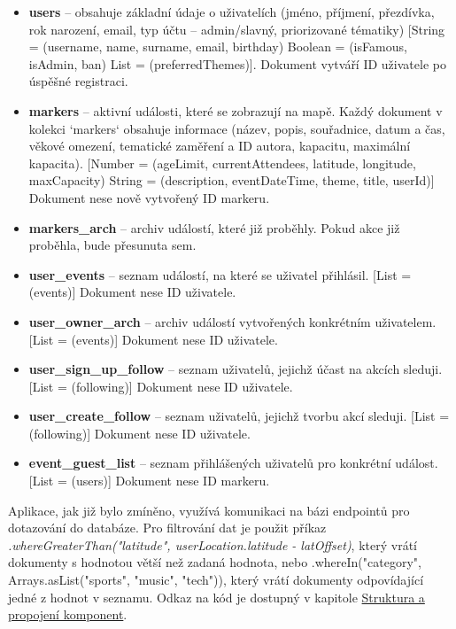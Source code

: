 \begin{itemize}
  \item \textbf{users} – obsahuje základní údaje o uživatelích (jméno, příjmení, přezdívka, rok narození, email, typ účtu – admin/slavný, priorizované tématiky) [String = (username, name, surname, email, birthday) Boolean = (isFamous, isAdmin, ban) List = (preferredThemes)]. Dokument vytváří ID uživatele po úspěšné registraci.
  \item \textbf{markers} – aktivní události, které se zobrazují na mapě. Každý dokument v kolekci `markers` obsahuje informace (název, popis, souřadnice, datum a čas, věkové omezení, tematické zaměření a ID autora, kapacitu, maximální kapacita). [Number = (ageLimit, currentAttendees, latitude, longitude, maxCapacity)
  String = (description, eventDateTime, theme, title, userId)] Dokument nese nově vytvořený ID markeru.
  \item \textbf{markers\_arch} – archiv událostí, které již proběhly. Pokud akce již proběhla, bude přesunuta sem.
  \item \textbf{user\_events} – seznam událostí, na které se uživatel přihlásil. [List = (events)] Dokument nese ID uživatele.
  \item \textbf{user\_owner\_arch} – archiv událostí vytvořených konkrétním uživatelem. [List = (events)] Dokument nese ID uživatele.
  \item \textbf{user\_sign\_up\_follow} – seznam uživatelů, jejichž účast na akcích sleduji. [List = (following)] Dokument nese ID uživatele.
  \item \textbf{user\_create\_follow} – seznam uživatelů, jejichž tvorbu akcí sleduji. [List = (following)] Dokument nese ID uživatele.
  \item \textbf{event\_guest\_list} – seznam přihlášených uživatelů pro konkrétní událost. [List = (users)] Dokument nese ID markeru.
\end{itemize}



Aplikace, jak již bylo zmíněno, využívá komunikaci na bázi endpointů pro dotazování do databáze. Pro filtrování dat je použit příkaz \textit{.whereGreaterThan("latitude", userLocation.latitude - latOffset)}, který vrátí dokumenty s hodnotou větší než zadaná hodnota, nebo .whereIn("category", Arrays.asList("sports", "music", "tech")), který vrátí dokumenty odpovídající jedné z hodnot v seznamu. Odkaz na kód je dostupný v kapitole \hyperref[sec:structure]{Struktura a propojení komponent}.

\cite{FirebaseDocs} \cite{FirebaseQuickStart} 

